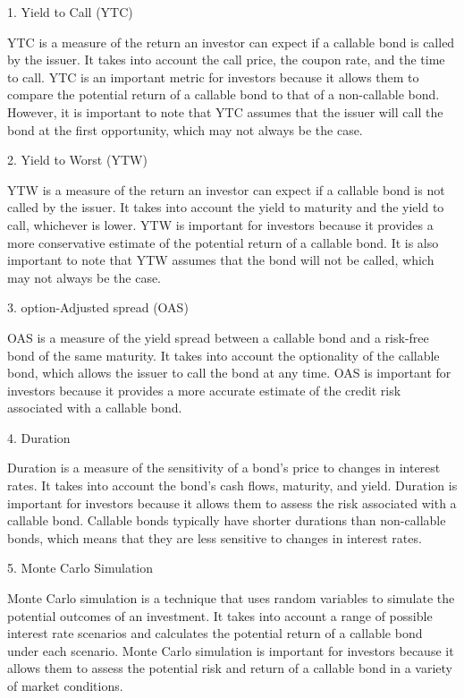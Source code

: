 \documentclass[12pt,a4paper]{article}
\begin{document}
1. Yield to Call (YTC)

YTC is a measure of the return an investor can expect if a callable bond is called by the issuer. It takes into account the call price, the coupon rate, and the time to call. YTC is an important metric for investors because it allows them to compare the potential return of a callable bond to that of a non-callable bond. However, it is important to note that YTC assumes that the issuer will call the bond at the first opportunity, which may not always be the case.

2. Yield to Worst (YTW)

YTW is a measure of the return an investor can expect if a callable bond is not called by the issuer. It takes into account the yield to maturity and the yield to call, whichever is lower. YTW is important for investors because it provides a more conservative estimate of the potential return of a callable bond. It is also important to note that YTW assumes that the bond will not be called, which may not always be the case.

3. option-Adjusted spread (OAS)

OAS is a measure of the yield spread between a callable bond and a risk-free bond of the same maturity. It takes into account the optionality of the callable bond, which allows the issuer to call the bond at any time. OAS is important for investors because it provides a more accurate estimate of the credit risk associated with a callable bond.

4. Duration

Duration is a measure of the sensitivity of a bond's price to changes in interest rates. It takes into account the bond's cash flows, maturity, and yield. Duration is important for investors because it allows them to assess the risk associated with a callable bond. Callable bonds typically have shorter durations than non-callable bonds, which means that they are less sensitive to changes in interest rates.

5. Monte Carlo Simulation

Monte Carlo simulation is a technique that uses random variables to simulate the potential outcomes of an investment. It takes into account a range of possible interest rate scenarios and calculates the potential return of a callable bond under each scenario. Monte Carlo simulation is important for investors because it allows them to assess the potential risk and return of a callable bond in a variety of market conditions.
\end{document}
